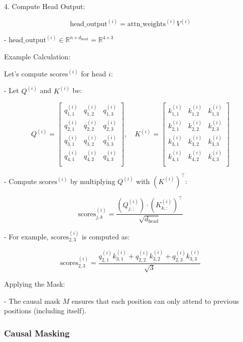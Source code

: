\documentclass{article}
\begin{document}
4. Compute Head Output:

   \[
   \text{head\_output}^{(i)} = \text{attn\_weights}^{(i)} V^{(i)}
   \]

   - \( \text{head\_output}^{(i)} \in \mathbb{R}^{n \times d_{\text{head}}} = \mathbb{R}^{4 \times 3} \)

Example Calculation:

Let's compute \( \text{scores}^{(i)} \) for head \( i \):

- Let \( Q^{(i)} \) and \( K^{(i)} \) be:

  \[
  Q^{(i)} = \begin{bmatrix}
      q^{(i)}_{1,1} & q^{(i)}_{1,2} & q^{(i)}_{1,3} \\
      q^{(i)}_{2,1} & q^{(i)}_{2,2} & q^{(i)}_{2,3} \\
      q^{(i)}_{3,1} & q^{(i)}_{3,2} & q^{(i)}_{3,3} \\
      q^{(i)}_{4,1} & q^{(i)}_{4,2} & q^{(i)}_{4,3} \\
  \end{bmatrix},
  \quad
  K^{(i)} = \begin{bmatrix}
      k^{(i)}_{1,1} & k^{(i)}_{1,2} & k^{(i)}_{1,3} \\
      k^{(i)}_{2,1} & k^{(i)}_{2,2} & k^{(i)}_{2,3} \\
      k^{(i)}_{3,1} & k^{(i)}_{3,2} & k^{(i)}_{3,3} \\
      k^{(i)}_{4,1} & k^{(i)}_{4,2} & k^{(i)}_{4,3} \\
  \end{bmatrix}
  \]

- Compute \( \text{scores}^{(i)} \) by multiplying \( Q^{(i)} \) with \( (K^{(i)})^\top \):

  \[
  \text{scores}^{(i)}_{j,k} = \frac{(Q^{(i)}_{j,:}) \cdot (K^{(i)}_{k,:})^\top}{\sqrt{d_{\text{head}}}}
  \]

- For example, \( \text{scores}^{(i)}_{2,3} \) is computed as:

  \[
  \text{scores}^{(i)}_{2,3} = \frac{q^{(i)}_{2,1} k^{(i)}_{3,1} + q^{(i)}_{2,2} k^{(i)}_{3,2} + q^{(i)}_{2,3} k^{(i)}_{3,3}}{\sqrt{3}}
  \]

Applying the Mask:

- The causal mask \( M \) ensures that each position can only attend to previous positions (including itself).

\subsubsection{Causal Masking}
\end{document}
